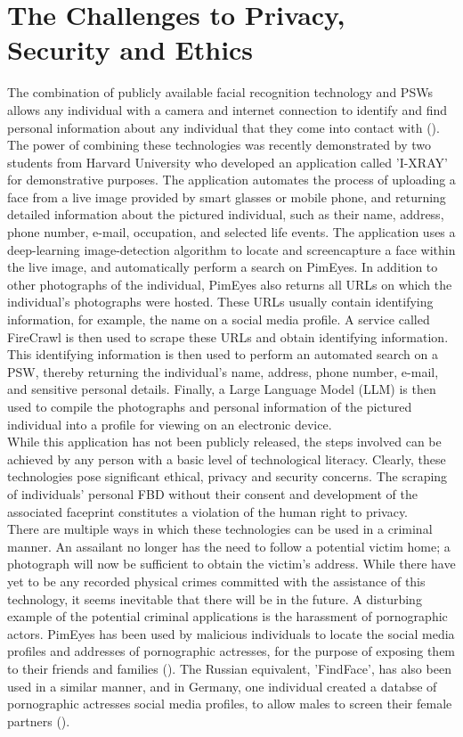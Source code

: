 \documentclass{article}
\begin{document}
\section*{\fontsize{10}{12}\selectfont The Challenges to Privacy, Security and Ethics}
The combination of publicly available facial recognition technology and PSWs allows any individual with a camera and internet connection to identify and find personal information about any individual that they come into contact with (\cite{conde2024five}). The power of combining these technologies was recently demonstrated by two students from Harvard University who developed an application called 'I-XRAY' for demonstrative purposes. The application automates the process of uploading a face from a live image provided by smart glasses or mobile phone, and returning detailed information about the pictured individual, such as their name, address, phone number, e-mail, occupation, and selected life events. The application uses a deep-learning image-detection algorithm to locate and screencapture a face within the live image, and automatically perform a search on PimEyes. In addition to other photographs of the individual, PimEyes also returns all URLs on which the individual's photographs were hosted. These URLs usually contain identifying information, for example, the name on a social media profile. A service called FireCrawl is then used to scrape these URLs and obtain identifying information. This identifying information is then used to perform an automated search on a PSW, thereby returning the individual's name, address, phone number, e-mail, and sensitive personal details. Finally, a Large Language Model (LLM) is then used to compile the photographs and personal information of the pictured individual into a profile for viewing on an electronic device.
\vspace{0.3cm} \\
While this application has not been publicly released, the steps involved can be achieved by any person with a basic level of technological literacy. Clearly, these technologies pose significant ethical, privacy and security concerns. The scraping of individuals' personal FBD without their consent and development of the associated faceprint constitutes a violation of the human right to privacy.
\vspace{0.3cm} \\
There are multiple ways in which these technologies can be used in a criminal manner. An assailant no longer has the need to follow a potential victim home; a photograph will now be sufficient to obtain the victim's address. While there have yet to be any recorded physical crimes committed with the assistance of this technology, it seems inevitable that there will be in the future. A disturbing example of the potential criminal applications is the harassment of pornographic actors. PimEyes has been used by malicious individuals to locate the social media profiles and addresses of pornographic actresses, for the purpose of exposing them to their friends and families (\cite{Kiene2024}). The Russian equivalent, 'FindFace', has also been used in a similar manner, and in Germany, one individual created a databse of pornographic actresses social media profiles, to allow males to screen their female partners (\cite{SophosNews2019}).
\end{document}
